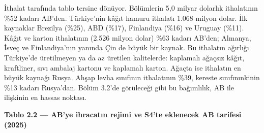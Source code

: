 İthalat tarafında tablo tersine dönüyor. Bölümlerin 5,0 milyar dolarlık ithalatının \%52 kadarı AB'den. Türkiye'nin kâğıt hamuru ithalatı 1.068 milyon dolar. İlk kaynaklar Brezilya (\%25), ABD (\%17), Finlandiya (\%16) ve Uruguay (\%11). Kâğıt ve karton ithalatının (2.526 milyon dolar) \%63 kadarı AB'den; Almanya, İsveç ve Finlandiya'nın yanında Çin de büyük bir kaynak. Bu ithalatın ağırlığı Türkiye'de üretilmeyen ya da az üretilen kalitelerde: kaplamalı ağaçsız kâğıt, kraftliner, sıvı ambalaj kartonu ve kaplamalı karton. Ağaçta ise ithalatın en büyük kaynağı Rusya. Ahşap levha sınıfının ithalatının \%39, kereste sınıfınınkinin \%13 kadarı Rusya'dan. Bölüm 3.2'de görüleceği gibi bu bağımlılık, AB ile ilişkinin en hassas noktası.


\textbf{Tablo 2.2 --- AB'ye ihracatın rejimi ve S4'te eklenecek AB tarifesi (2025)}

\nopagebreak[4]

\begingroup\gbtablo\footnotesize

